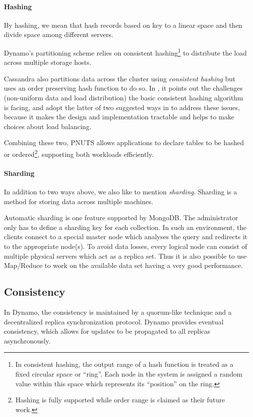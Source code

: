 \documentclass[12pt,letter]{article}
\begin{document}
\paragraph*{Hashing}
By hashing, we mean that hash records based on key to a linear space and then divide space among different servers.

Dynamo's partitioning scheme relies on consistent hashing\footnote{In consistent hashing, the output range of a hash function is treated as a fixed circular space or ``ring''. Each node in the system is assigned a random value within this space which represents its ``position'' on the ring.} to distribute the load across multiple storage hosts. 

Cassandra also partitions data across the cluster using \textit{consistent hashing} but uses an order preserving hash function to do so. In \citep{LakshamAvinash2010}, it points out the challenges (non-uniform data and load distribution) the basic consistent hashing algorithm\citep{Karger1997} is facing, and adopt the latter of two suggested ways in \citep{Stoica2003} to address these issues, because it makes the design and implementation tractable and helps to make choices about load balancing.

Combining these two, PNUTS allows applications to declare tables to be hashed or ordered\footnote{Hashing is fully supported while order range is claimed as their future work.}, supporting both workloads efficiently.

\paragraph*{Sharding}
In addition to two ways above, we also like to mention \textit{sharding}. Sharding is a method for storing data across multiple machines. 

Automatic sharding is one feature supported by MongoDB. The administrator only has to define a sharding key for each collection. In such an environment, the clients connect to a special master node which analyses the query and redirects it to the appropriate node(s). To avoid data losses, every logical node can consist of multiple physical servers which act as a replica set. Thus it is also possible to use Map/Reduce to work on the available data set having a very good performance.

\subsection{Consistency}
In Dynamo, the consistency is maintained by a quorum-like technique and a decentralized replica synchronization protocol. Dynamo provides eventual consistency, which allows for updates to be propagated to all replicas asynchronously.
\end{document}
